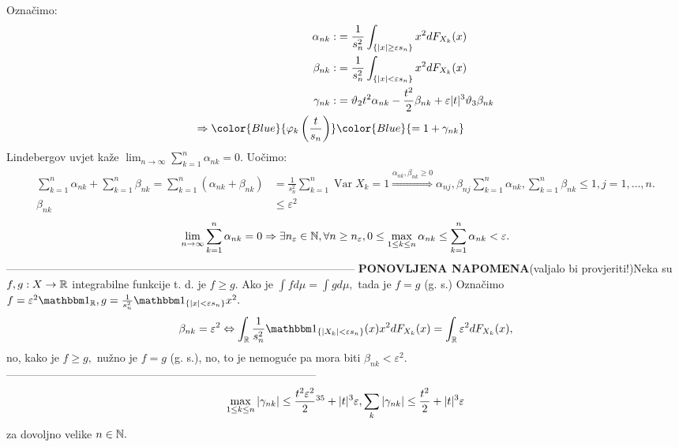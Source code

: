 \documentclass{article}
\newcommand{\Var}{\operatorname{Var}}
\begin{document}
Označimo: \[\begin{aligned}\alpha_{nk}:&=\frac1{s_n^2}\int_{\left\{|x|\ge\varepsilon s_n\right\}}x^2dF_{X_k}(x)\\\beta_{nk}:&=\frac1{s_n^2}\int_{\left\{|x|<\varepsilon s_n\right\}}x^2dF_{X_k}(x)\\\gamma_{nk}:&=\vartheta_2 t^2\alpha_{nk}-\frac{t^2}2\beta_{nk}+\varepsilon|t|^3\vartheta_3\beta_{nk}\\\Rightarrow{{\color{Blue}{\varphi_k\left(\dfrac{t}{s_n}\right)}}}&{\color{Blue}{=1+\gamma_{nk}}}\end{aligned}\] Lindebergov uvjet kaže \(\displaystyle\lim_{n\to\infty}\sum_{k=1}^n\alpha_{nk}=0.\) Uočimo: \[\begin{aligned}\sum_{k=1}^n\alpha_{nk}+\sum_{k=1}^n\beta_{nk}=\sum_{k=1}^n(\alpha_{nk}+\beta_{nk})&=\frac1{s_n^2}\sum_{k=1}^n\Var X_k=1\overset{\alpha_{nk},\beta_{nk}\ge 0}{\Rightarrow}\alpha_{nj},\beta_{nj}\sum_{k=1}^n\alpha_{nk},\sum_{k=1}^n\beta_{nk}\le 1,j=1,\ldots,n.\\\beta_{nk}&\le\varepsilon^2\end{aligned}\]
\newpage\restoregeometry
\[\lim_{n\to\infty}\sum_{k=1}^n\alpha_{nk}=0\Rightarrow\exists n_\varepsilon\in\Bbb N,\forall n\ge n_\varepsilon,0\le\max_{1\le k\le n}\alpha_{nk}\le\sum_{k=1}^n\alpha_{nk}<\varepsilon.\]
-----------------------------------------------------------------------------------------------\newline\newline
\textbf{PONOVLJENA NAPOMENA}(valjalo bi provjeriti!)\newline Neka su \(f,g:X\to\Bbb R\) integrabilne funkcije t. d. je \(f\ge g.\) Ako je \(\int fd\mu=\int gd\mu,\) tada je \(f=g\) (g. s.)\newline\newline
Označimo \(f=\varepsilon^2\mathbbm 1_{\Bbb R},g=\frac1{s_n^2}\mathbbm 1_{\left\{|x| <\varepsilon s_n\right\}}x^2.\)
\[\beta_{nk}=\varepsilon^2\Leftrightarrow \int_{\Bbb R}\frac1{s_n^2}\mathbbm 1_{\left\{|X_k| <\varepsilon s_n\right\}}(x)x^2dF_{X_k}(x)=\int_{\Bbb R}\varepsilon^2 dF_{X_k}(x),\] no, kako je \(f\ge g,\) nužno je \(f=g\) (g. s.), no, to je nemoguće pa mora biti \(\beta_{nk}<\varepsilon^2.\)\newline\newline------------------------------------------------------------------------------------\newline\newline
\[\max_{1\le k\le n}|\gamma_{nk}|\le\frac{t^2\varepsilon^2}2\footnotemark[35]+|t|^3\varepsilon,\sum_k|\gamma_{nk}|\le\frac{t^2}2+|t|^3\varepsilon\] za dovoljno velike \(n\in\Bbb N.\) 
\end{document}
